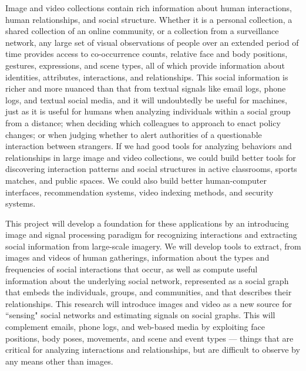 \pagestyle{plain} 

 \label{sec:intro}

Image and video collections contain rich information about human interactions, human relationships, and social structure. Whether it is a personal collection, a shared collection of an online community, or a collection from a surveillance network, any large set of visual observations of people over an extended period of time provides access to co-occurrence counts, relative face and body positions, gestures, expressions, and scene types, all of which provide information about identities, attributes, interactions, and relationships. This social information is richer and more nuanced than that from textual signals like email logs, phone logs, and textual social media, and it will undoubtedly be useful for machines, just as it is useful for humans when analyzing individuals within a social group from a distance; when deciding which colleagues to approach to enact policy changes; or when judging whether to alert authorities of a questionable interaction between strangers. If we had good tools for analyzing behaviors and relationships in large image and video collections, we could build better tools for discovering interaction patterns and social structures in active classrooms, sports matches, and  public spaces. We could also build better human-computer interfaces, recommendation systems, video indexing methods, and security systems.
 
This project will develop a foundation for these applications by an introducing image and signal processing paradigm for recognizing interactions and extracting social information from large-scale imagery. We will develop tools to extract, from images and videos of human gatherings,  information about the types and frequencies of social interactions that occur, as well as compute useful information about the underlying social network, represented as a social graph that embeds the individuals, groups, and communities, and that describes their relationships.  This research will introduce images and video as a new source for ``sensing" social networks and estimating signals on social graphs. This will complement emails, phone logs, and web-based media by exploiting face positions, body poses, movements, and scene and event types --- things that are critical for analyzing interactions and relationships, but are difficult to observe by any means other than images.


